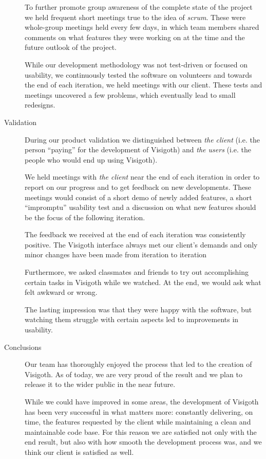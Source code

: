 \documentclass[a4paper,11pt]{article}
\begin{document}
\begin{description}
  To further promote group awareness of the complete state of the
  project we held frequent short meetings true to the idea of
  \emph{scrum}. These were whole-group meetings held every few days,
  in which team members shared comments on what features they were
  working on at the time and the future outlook of the project.

  While our development methodology was not test-driven or focused on
  usability, we continuously tested the software on volunteers and
  towards the end of each iteration, we held meetings with our
  client. These tests and meetings uncovered a few problems, which
  eventually lead to small redesigns.

\item[Validation]

  During our product validation we distinguished between \emph{the
    client} (i.e.  the person ``paying'' for the development of
  Visigoth) and \emph{the users} (i.e. the people who would end up
  using Visigoth).

  We held meetings with \emph{the client} near the end of each
  iteration in order to report on our progress and to get feedback on
  new developments. These meetings would consist of a short demo of
  newly added features, a short ``impromptu'' usability test and a
  discussion on what new features should be the focus of the following
  iteration.

  The feedback we received at the end of each iteration was
  consistently positive. The Visigoth interface always met our
  client's demands and only minor changes have been made from
  iteration to iteration

  Furthermore, we asked classmates and friends to try out
  accomplishing certain tasks in Visigoth while we watched. At the
  end, we would ask what felt awkward or wrong.

  The lasting impression was that they were happy with the software,
  but watching them struggle with certain aspects led to improvements
  in usability.

\item[Conclusions]

  Our team has thoroughly enjoyed the process that led to the creation
  of Visigoth. As of today, we are very proud of the result and we plan to
  release it to the wider public in the near future.

  While we could have improved in some areas, the development of
  Visigoth has been very successful in what matters more: constantly
  delivering, on time, the features requested by the client while
  maintaining a clean and maintainable code base.
  For this reason we are satisfied not only with the end
  result, but also with how smooth the development process was, and we
  think our client is satisfied as well.

\end{description}
\end{document}
